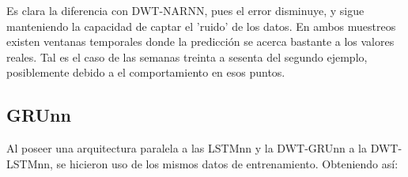 Es clara la diferencia con DWT-NARNN, pues el error disminuye, y sigue manteniendo la capacidad de captar el 'ruido' de los datos. En ambos muestreos existen ventanas temporales donde la predicción se acerca bastante a los valores reales. Tal es el caso de las semanas treinta a sesenta del segundo ejemplo, posiblemente debido a el comportamiento en esos puntos.

\newpage
\subsection{GRUnn}

Al poseer una arquitectura paralela a las LSTMnn y la DWT-GRUnn a la DWT-LSTMnn, se hicieron uso de los mismos datos de entrenamiento. Obteniendo así:

